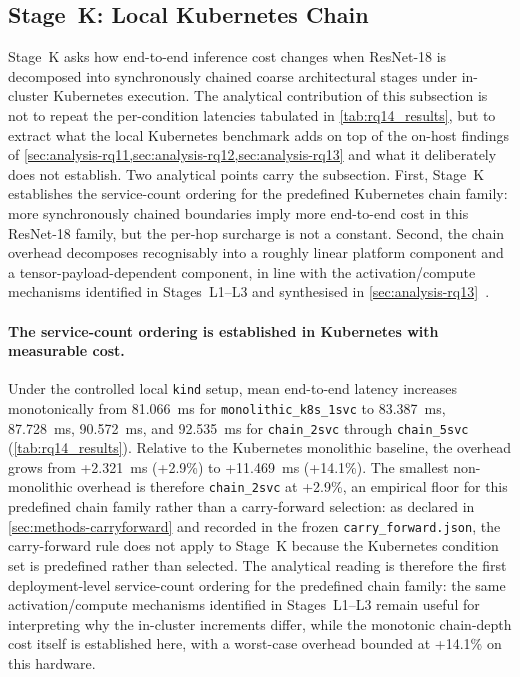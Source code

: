 \subsection{Stage~K: Local Kubernetes Chain}
\label{sec:analysis-rq14}

Stage~K asks how end-to-end inference cost changes when ResNet-18 is
decomposed into synchronously chained coarse architectural stages under
in-cluster Kubernetes execution. The analytical contribution of this
subsection is not to repeat the per-condition latencies tabulated in
\cref{tab:rq14_results}, but to extract what the local Kubernetes
benchmark adds on top of the on-host findings of
\cref{sec:analysis-rq11,sec:analysis-rq12,sec:analysis-rq13} and what
it deliberately does not establish. Two analytical points carry the
subsection. First, Stage~K establishes the service-count ordering for
the predefined Kubernetes chain family: more synchronously chained
boundaries imply more end-to-end cost in this ResNet-18 family, but the
per-hop surcharge is not a constant. Second, the chain overhead
decomposes recognisably into a roughly linear platform component and a
tensor-payload-dependent component, in line with the activation/compute
mechanisms identified in Stages~L1--L3 and synthesised in
\cref{sec:analysis-rq13}~\cite{dnnsplit,deeperthings}.

\paragraph{The service-count ordering is established in Kubernetes with measurable cost.}
Under the controlled local \texttt{kind} setup, mean end-to-end latency
increases monotonically from 81.066~ms for
\texttt{monolithic\_k8s\_1svc} to 83.387~ms, 87.728~ms, 90.572~ms, and
92.535~ms for \texttt{chain\_2svc} through \texttt{chain\_5svc}
(\cref{tab:rq14_results}). Relative to the Kubernetes monolithic
baseline, the overhead grows from +2.321~ms (+2.9\%) to +11.469~ms
(+14.1\%). The smallest non-monolithic overhead is therefore
\texttt{chain\_2svc} at +2.9\%, an empirical floor for this predefined
chain family rather than a carry-forward selection: as declared in
\cref{sec:methods-carryforward} and recorded in the frozen
\texttt{carry\_forward.json}, the carry-forward rule does not apply to
Stage~K because the Kubernetes condition set is predefined rather than
selected. The analytical reading is therefore the first deployment-level
service-count ordering for the predefined chain family: the same
activation/compute mechanisms identified in Stages~L1--L3 remain useful
for interpreting why the in-cluster increments differ, while the
monotonic chain-depth cost itself is established here, with a worst-case
overhead bounded at +14.1\% on this hardware.

